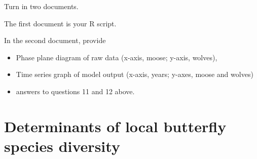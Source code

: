 \documentclass[
  letterpaper,
  DIV=11,
  numbers=noendperiod]{scrreprt}
\providecommand{\tightlist}{%
  \setlength{\itemsep}{0pt}\setlength{\parskip}{0pt}}
\begin{document}
Turn in two documents.

The first document is your R script.

In the second document, provide

\begin{itemize}
\tightlist
\item
  Phase plane diagram of raw data (x-axis, moose; y-axis, wolves),
\item
  Time series graph of model output (x-axis, years; y-axes, moose and
  wolves)
\item
  answers to questions 11 and 12 above.
\end{itemize}


\chapter{Determinants of local butterfly species
diversity}\label{determinants-of-local-butterfly-species-diversity}
\end{document}
